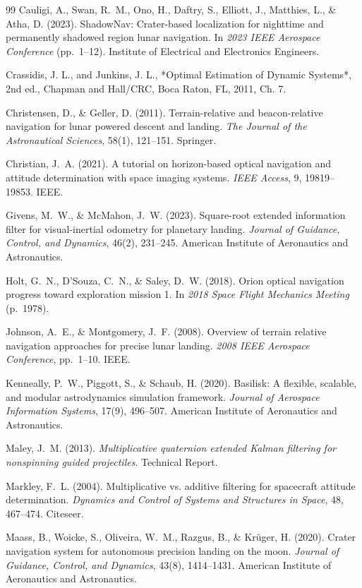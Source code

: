 \documentclass[conf]{new-aiaa}
\begin{document}
\begin{thebibliography}{99}
Cauligi, A., Swan, R.~M., Ono, H., Daftry, S., Elliott, J., Matthies, L., \& Atha, D. (2023).
ShadowNav: Crater-based localization for nighttime and permanently shadowed region lunar navigation.
In \textit{2023 IEEE Aerospace Conference} (pp.~1--12).
Institute of Electrical and Electronics Engineers.


Crassidis, J. L., and Junkins, J. L., *Optimal Estimation of Dynamic Systems*, 2nd ed., Chapman and Hall/CRC, Boca Raton, FL, 2011, Ch. 7.


Christensen, D., \& Geller, D. (2011).
Terrain-relative and beacon-relative navigation for lunar powered descent and landing.
\textit{The Journal of the Astronautical Sciences}, 58(1), 121--151. Springer.


Christian, J.~A. (2021).
A tutorial on horizon-based optical navigation and attitude determination with space imaging systems.
\textit{IEEE Access}, 9, 19819--19853. IEEE.


Givens, M.~W., \& McMahon, J.~W. (2023).
Square-root extended information filter for visual-inertial odometry for planetary landing.
\textit{Journal of Guidance, Control, and Dynamics}, 46(2), 231--245.
American Institute of Aeronautics and Astronautics.


Holt, G.~N., D'Souza, C.~N., \& Saley, D.~W. (2018).
Orion optical navigation progress toward exploration mission 1.
In \textit{2018 Space Flight Mechanics Meeting} (p.~1978).

Johnson, A.~E., \& Montgomery, J.~F. (2008).
Overview of terrain relative navigation approaches for precise lunar landing.
\textit{2008 IEEE Aerospace Conference}, pp.\ 1--10.
IEEE.

Kenneally, P.~W., Piggott, S., \& Schaub, H. (2020).
Basilisk: A flexible, scalable, and modular astrodynamics simulation framework.
\textit{Journal of Aerospace Information Systems}, 17(9), 496--507.
American Institute of Aeronautics and Astronautics.


Maley, J.~M. (2013).
\textit{Multiplicative quaternion extended Kalman filtering for nonspinning guided projectiles}.
Technical Report.

Markley, F.~L. (2004).
Multiplicative vs. additive filtering for spacecraft attitude determination.
\textit{Dynamics and Control of Systems and Structures in Space}, 48, 467--474. Citeseer.

Maass, B., Woicke, S., Oliveira, W.~M., Razgus, B., \& Kr{\"u}ger, H. (2020).
Crater navigation system for autonomous precision landing on the moon.
\textit{Journal of Guidance, Control, and Dynamics}, 43(8), 1414--1431. American Institute of Aeronautics and Astronautics.

\end{thebibliography}
\end{document}
